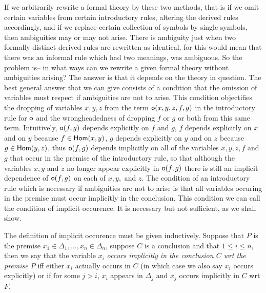 If we arbitrarily rewrite a formal theory by these two methods, that is if we omit certain variables from certain introductory rules, altering the derived rules accordingly, and if we replace certain collection of symbols by single symbols, then ambiguities may or may not arise.
%
There is ambiguity just when two formally distinct derived rules are rewritten as identical, for this would mean that there was an informal rule which had two meanings, was ambiguous.
%
So the problem is-- in what ways can we rewrite a given formal theory without ambiguities arising?
%
The answer is that it depends on the theory in question.
%
The best general answer that we can give consists of a condition that the omission of variables must respect if ambiguities are not to arise. This condition objectifies the dropping of variables $x,y,z$ from the term $\mathsf{o}(x,y,z,f,g)$ in the introductory rule for $\mathsf{o}$ and the wrongheadedness of dropping $f$ or $g$ or both from this same term.
%
Intuitively, $\mathsf{o}(f,g)$ depends explicitly on $f$ and $g$, $f$ depends explicitly on $x$ and on $y$ because $f\in\mathsf{Hom}(x,y)$, $g$ depends explicitly on $y$ and on $z$ because $g\in\mathsf{Hom}(y,z)$, thus $\mathsf{o}(f,g)$ depends implicitly on all of the variables $x,y,z,f$ and $g$ that occur in the premise of the introductory rule, so that although the variables $x,y$ and $z$ no longer appear explicitly in $\mathsf{o}(f,g)$ there is still an implicit dependence of $\mathsf{o}(f,g)$ on each of $x,y,$ and $z$.
%
The condition of an introductory rule which is necessary if ambiguities are not to arise is that all variables occuring in the premise must occur implicitly in the conclusion.
%
This condition we can call the condition of implicit occurence.
%
It is necessary but not sufficient, as we shall show.

The definition of implicit occurence must be given inductively.
%
Suppose that $P$ is the premise $x_1\in\Delta_1,\ldots,x_n\in\Delta_n$, suppose $C$ is a conclusion and that $1\leq i\leq n$, then we say that the variable $x_i$ \emph{occurs implicitly in the conclusion $C$ wrt the premise $P$} iff either $x_i$ actually occurs in $C$ (in which case we also say $x_i$ occurs explicitly) or if for some $j>i$, $x_i$ appears in $\Delta_j$ and $x_j$ occurs implicitly in $C$ wrt $F$.

